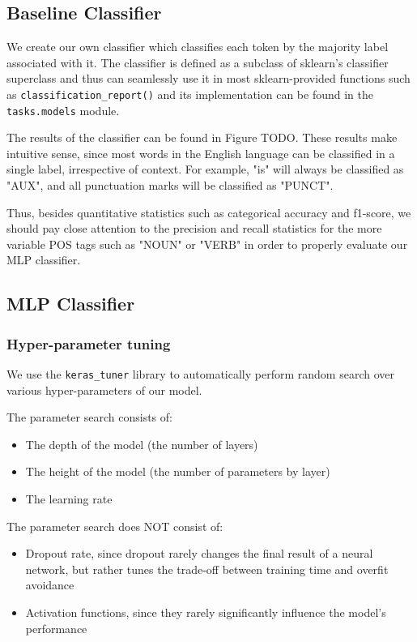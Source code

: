 \documentclass[10pt, a4paper]{article}
\begin{document}
	\subsection{Baseline Classifier}
	
	We create our own classifier which classifies each token by the majority label associated with it. The classifier is defined as a subclass of sklearn's classifier superclass and thus can seamlessly use it in most sklearn-provided functions such as \texttt{classification\_report()} and its implementation can be found in the \texttt{tasks.models} module.
	
	The results of the classifier can be found in Figure TODO. These results make intuitive sense, since most words in the English language can be classified in a single label, irrespective of context. For example, "is" will always be classified as "AUX", and all punctuation marks will be classified as "PUNCT".
	
	Thus, besides quantitative statistics such as categorical accuracy and f1-score, we should pay close attention to the precision and recall statistics for the more variable POS tags such as "NOUN" or "VERB" in order to properly evaluate our MLP classifier.
	

	\subsection{MLP Classifier}
	
	\subsubsection{Hyper-parameter tuning}
	
	We use the \texttt{keras\_tuner} library to automatically perform random search over various hyper-parameters of our model.
	
	The parameter search consists of:
	\begin{itemize}
		\item The depth of the model (the number of layers)
		\item The height of the model (the number of parameters by layer) 
		\item The learning rate
	\end{itemize}

	
	The parameter search does NOT consist of:
	\begin{itemize}
		\item Dropout rate, since dropout rarely changes the final result of a neural network, but rather tunes the trade-off between training time and overfit avoidance
		\item Activation functions, since they rarely significantly influence the model's performance
	\end{itemize}
	
\end{document}

